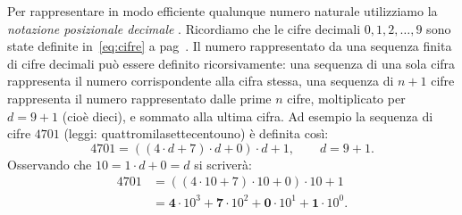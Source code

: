Per rappresentare in modo efficiente qualunque numero naturale utilizziamo la 
\emph{notazione posizionale decimale}%
%
.
Ricordiamo che le cifre decimali $0,1,2,\dots, 9$ sono state definite in~\eqref{eq:cifre}
a pag~\pageref{eq:cifre}.
Il numero rappresentato da una sequenza finita di cifre decimali può essere 
definito ricorsivamente: una sequenza di una sola cifra rappresenta il numero 
corrispondente alla cifra stessa, una sequenza di $n+1$ cifre rappresenta il 
numero rappresentato dalle prime $n$ cifre, moltiplicato per $d=9+1$ (cioè dieci),
e sommato alla ultima cifra. 
Ad esempio la sequenza di cifre $4701$ (leggi: quattromilasettecentouno)
è definita così:
\[ 
  4701 = ((4\cdot d+7)\cdot d+0)\cdot d+1, \qquad d=9+1.
\]
Osservando che $10 = 1\cdot d + 0 = d$ si scriverà:
\begin{align*}
  4701 
  & = ((4\cdot 10 + 7)\cdot 10 +0)\cdot 10 + 1 \\
  & = \mathbf 4\cdot 10^3 + \mathbf 7\cdot 10^2 + \mathbf 0\cdot 10^1 + \mathbf 1 \cdot 10^0. 
\end{align*}

